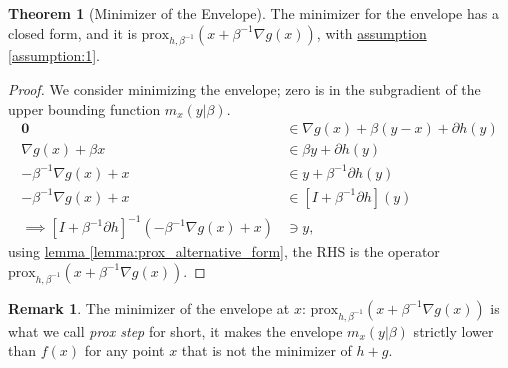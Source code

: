 \documentclass[]{article}
\theoremstyle{definition}
\newtheorem{theorem}{Theorem}       %
\newtheorem{remark}{Remark}[subsection]
{
    \newtheorem{assumption}{Assumption}
}
\begin{document}
        \begin{theorem}[Minimizer of the Envelope]\label{thm:minimizer_envelope}
            The minimizer for the envelope has a closed form, and it is $\text{prox}_{h, \beta^{-1}}(x + \beta^{-1}\nabla g(x))$, with \hyperref[assumption:1]{assumption \ref*{assumption:1}}. 
        \end{theorem}
        \begin{proof}
            We consider minimizing the envelope; zero is in the subgradient of the upper bounding function $m_x(y|\beta)$. 
            \begin{align*}
                \mathbf 0 &\in 
                \nabla g(x) + {\beta}(y - x) + \partial h(y)
                \\
                \nabla g(x) + \beta x & \in
                \beta y + \partial h(y)
                \\
                -\beta^{-1} \nabla g(x) + x &\in y + \beta^{-1} \partial h(y)
                \\
                -\beta^{-1} \nabla g(x) + x &\in [I + \beta^{-1} \partial h](y)
                \\
                \implies
                [I + \beta^{-1}\partial h]^{-1}(- \beta^{-1} \nabla g(x) + x) 
                & \ni y,
            \end{align*}
            using \hyperref[lemma:prox_alternative_form]{lemma \ref*{lemma:prox_alternative_form}}, the RHS is the operator $\text{prox}_{h, \beta^{-1}}(x + \beta^{-1}\nabla g(x))$. 
        \end{proof}
        \begin{remark}
            The minimizer of the envelope at $x$: $\text{prox}_{h, \beta^{-1}}(x + \beta^{-1}\nabla g(x))$ is what we call \emph{prox step} for short, it makes the envelope $m_x(y|\beta)$ strictly lower than $f(x)$ for any point $x$ that is not the minimizer of $h + g$. 
        \end{remark}
\end{document}
